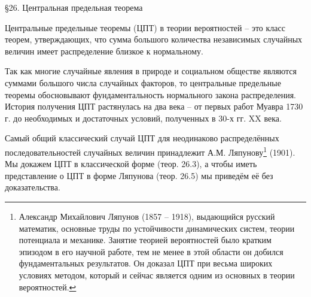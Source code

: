 
§26. Центральная предельная теорема
\begin{zam}
Центральные предельные теоремы (ЦПТ) в теории вероятностей -- это класс теорем, утверждающих, что сумма большого количества независимых случайных величин имеет распределение близкое к нормальному. 

Так как многие случайные явления в природе и социальном обществе являются суммами большого числа случайных факторов, то центральные предельные теоремы обосновывают фундаментальность нормального закона распределения. История получения ЦПТ растянулась на два века -- от первых работ Муавра 1730 г. до необходимых и достаточных условий, полученных в 30-х гг. XX века. 

Самый общий классический случай ЦПТ для неодинаково распределённых последовательностей случайных величин принадлежит А.М. Ляпунову\footnote{Александр Михайлович Ляпунов (1857 -- 1918), выдающийся русский математик, основные труды
по устойчивости динамических систем, теории потенциала и механике. Занятие теорией вероятностей было кратким эпизодом в его научной работе, тем не менее в этой области он добился фундаментальных результатов. Он доказал ЦПТ при весьма широких условиях методом, который и сейчас является одним
из основных в теории вероятностей.} (1901). Мы докажем ЦПТ в классической форме (теор. 26.3), а чтобы иметь представление о ЦПТ в форме Ляпунова (теор. 26.5) мы приведём её без доказательства. 
\end{zam}

